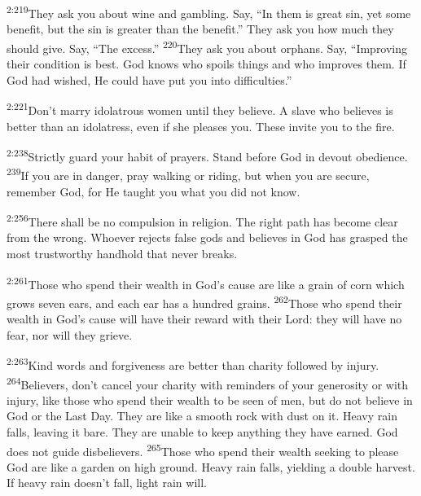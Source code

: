 \documentclass[openany,12pt,english]{book}
\newenvironment{para}{\par\pretolerance=100\tolerance=200\setlength{\emergencystretch}{0.6em}\relax}{\par}
\begin{document}
\begin{para}
    \textsuperscript{2:219}\thinspace{}They ask you a\-bout wine and gambling. Say, “In them is great sin, yet some ben\-e\-fit, but the sin is greater than the ben\-e\-fit.” They ask you how much they should give. Say, “The ex\-cess.”
    \textsuperscript{220}\thinspace{}They ask you a\-bout orphans. Say, “Im\-prov\-ing their con\-di\-tion is best. God knows who spoils things and who improves them. If God had wished, He could have put you in\-to difficul\-ties.”
\end{para}

\begin{para}
    \textsuperscript{2:221}\thinspace{}Don't mar\-ry i\-dol\-a\-trous wom\-en un\-til they be\-lieve. A slave who believes is bet\-ter than an i\-dol\-a\-tress, e\-ven if she pleases you. These in\-vite you to the fire.
\end{para}

\begin{para}
    \textsuperscript{2:238}\thinspace{}Strict\-ly guard your hab\-it of prayers. Stand be\-fore God in de\-vout o\-be\-di\-ence.
    \textsuperscript{239}\thinspace{}If you are in dan\-ger, pray walk\-ing or rid\-ing, but when you are se\-cure, re\-mem\-ber God, for He taught you what you did not know.
\end{para}

\begin{para}
    \textsuperscript{2:256}\thinspace{}There shall be no com\-pul\-sion in re\-li\-gion. The right path has be\-come clear from the wrong. Who\-ev\-er rejects false gods and believes in God has grasped the most trust\-wor\-thy hand\-hold that nev\-er breaks.
\end{para}

\begin{para}
    \textsuperscript{2:261}\thinspace{}Those who spend their wealth in God's cause are like a grain of corn which grows sev\-en ears, and each ear has a hun\-dred grains.
    \textsuperscript{262}\thinspace{}Those who spend their wealth in God's cause will have their re\-ward with their Lord: they will have no fear, nor will they grieve.
\end{para}

\begin{para}
    \textsuperscript{2:263}\thinspace{}Kind words and for\-give\-ness are bet\-ter than char\-i\-ty followed by in\-ju\-ry.
    \textsuperscript{264}\thinspace{}Believers, don't can\-cel your char\-i\-ty with reminders of your gen\-er\-os\-i\-ty or with in\-ju\-ry, like those who spend their wealth to be seen of men, but do not be\-lieve in God or the Last Day. They are like a smooth rock with dust on it. Heav\-y rain falls, leav\-ing it bare. They are un\-a\-ble to keep any\-thing they have earned. God does not guide disbelievers.
    \textsuperscript{265}\thinspace{}Those who spend their wealth seek\-ing to please God are like a gar\-den on high ground. Heav\-y rain falls, yield\-ing a dou\-ble har\-vest. If heav\-y rain does\-n't fall, light rain will.
\end{para}
\end{document}
